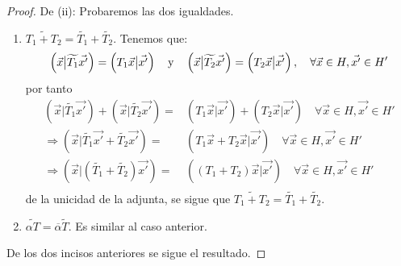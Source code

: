 \documentclass[12pt]{report}
\theoremstyle{largebreak}
\newcommand\adj[1]{\ensuremath{\widetilde{#1}}}
\newcommand\pint[2]{\ensuremath{\left(#1\big|#2\right)}}
\newcommand\conj[1]{\ensuremath{\overline{#1}}}
\begin{document}
\begin{proof}
        De (ii): Probaremos las dos igualdades.
        \begin{enumerate}
            \item $\adj{T_1+T_2}=\adj{T_1}+\adj{T_2}$. Tenemos que:
            \begin{equation*}
                \pint{\vec{x}}{\adj{T_1}\vec{x'}}=\pint{T_1\vec{x}}{\vec{x'}}\quad\textup{y}\quad\pint{\vec{x}}{\adj{T_2}\vec{x'}}=\pint{T_2\vec{x}}{\vec{x'}},\quad\forall\vec{x}\in H,\vec{x'}\in H'
            \end{equation*}
            por tanto
            \begin{equation*}
                \begin{split}
                    \pint{\vec{x}}{\adj{T_1}\vec{x'}}+\pint{\vec{x}}{\adj{T_2}\vec{x'}}=&\pint{T_1\vec{x}}{\vec{x'}}+\pint{T_2\vec{x}}{\vec{x'}}\quad\forall\vec{x}\in H,\vec{x'}\in H'\\
                    \Rightarrow\pint{\vec{x}}{\adj{T_1}\vec{x'}+\adj{T_2}\vec{x'}}=&\pint{T_1\vec{x}+T_2\vec{x}}{\vec{x'}}\quad\forall\vec{x}\in H,\vec{x'}\in H'\\
                    \Rightarrow \pint{\vec{x}}{(\adj{T_1}+\adj{T_2})\vec{x'}}=&\pint{(T_1+T_2)\vec{x}}{\vec{x'}}\quad\forall\vec{x}\in H,\vec{x'}\in H'\\
                \end{split}
            \end{equation*}
            de la unicidad de la adjunta, se sigue que $\adj{T_1+T_2}=\adj{T_1}+\adj{T_2}$.
            \item $\adj{\alpha T}=\conj{\alpha}\adj{T}$. Es similar al caso anterior.
        \end{enumerate}
        De los dos incisos anteriores se sigue el resultado.


\end{proof}
\end{document}
